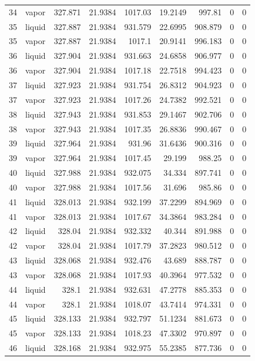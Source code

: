 \begin{longtable}{r l r r r r r r r}
34 & vapor & 327.871 & 21.9384 & 1017.03 & 19.2149 & 997.81 & 0 & 0 \\
35 & liquid & 327.887 & 21.9384 & 931.579 & 22.6995 & 908.879 & 0 & 0 \\
35 & vapor & 327.887 & 21.9384 & 1017.1 & 20.9141 & 996.183 & 0 & 0 \\
36 & liquid & 327.904 & 21.9384 & 931.663 & 24.6858 & 906.977 & 0 & 0 \\
36 & vapor & 327.904 & 21.9384 & 1017.18 & 22.7518 & 994.423 & 0 & 0 \\
37 & liquid & 327.923 & 21.9384 & 931.754 & 26.8312 & 904.923 & 0 & 0 \\
37 & vapor & 327.923 & 21.9384 & 1017.26 & 24.7382 & 992.521 & 0 & 0 \\
38 & liquid & 327.943 & 21.9384 & 931.853 & 29.1467 & 902.706 & 0 & 0 \\
38 & vapor & 327.943 & 21.9384 & 1017.35 & 26.8836 & 990.467 & 0 & 0 \\
39 & liquid & 327.964 & 21.9384 & 931.96 & 31.6436 & 900.316 & 0 & 0 \\
39 & vapor & 327.964 & 21.9384 & 1017.45 & 29.199 & 988.25 & 0 & 0 \\
40 & liquid & 327.988 & 21.9384 & 932.075 & 34.334 & 897.741 & 0 & 0 \\
40 & vapor & 327.988 & 21.9384 & 1017.56 & 31.696 & 985.86 & 0 & 0 \\
41 & liquid & 328.013 & 21.9384 & 932.199 & 37.2299 & 894.969 & 0 & 0 \\
41 & vapor & 328.013 & 21.9384 & 1017.67 & 34.3864 & 983.284 & 0 & 0 \\
42 & liquid & 328.04 & 21.9384 & 932.332 & 40.344 & 891.988 & 0 & 0 \\
42 & vapor & 328.04 & 21.9384 & 1017.79 & 37.2823 & 980.512 & 0 & 0 \\
43 & liquid & 328.068 & 21.9384 & 932.476 & 43.689 & 888.787 & 0 & 0 \\
43 & vapor & 328.068 & 21.9384 & 1017.93 & 40.3964 & 977.532 & 0 & 0 \\
44 & liquid & 328.1 & 21.9384 & 932.631 & 47.2778 & 885.353 & 0 & 0 \\
44 & vapor & 328.1 & 21.9384 & 1018.07 & 43.7414 & 974.331 & 0 & 0 \\
45 & liquid & 328.133 & 21.9384 & 932.797 & 51.1234 & 881.673 & 0 & 0 \\
45 & vapor & 328.133 & 21.9384 & 1018.23 & 47.3302 & 970.897 & 0 & 0 \\
46 & liquid & 328.168 & 21.9384 & 932.975 & 55.2385 & 877.736 & 0 & 0 \\

\end{longtable}
